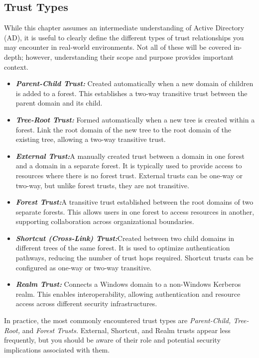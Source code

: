 \subsection{Trust Types}
While this chapter assumes an intermediate understanding of Active Directory (AD), it is useful to clearly define the different types of trust relationships you may encounter in real-world environments. Not all of these will be covered in-depth; however, understanding their scope and purpose provides important context.
\begin{itemize}
    \item \textbf{\textit{Parent-Child Trust:}} Created automatically when a new domain of children is added to a forest. This establishes a two-way transitive trust between the parent domain and its child.
        \item \textbf{\textit{Tree-Root Trust:}} Formed automatically when a new tree is created within a forest. Link the root domain of the new tree to the root domain of the existing tree, allowing a two-way transitive trust.
        \item \textbf{\textit{External Trust:}}A manually created trust between a domain in one forest and a domain in a separate forest. It is typically used to provide access to resources where there is no forest trust. External trusts can be one-way or two-way, but unlike forest trusts, they are not transitive.
        \item \textbf{\textit{Forest Trust:}}A transitive trust established between the root domains of two separate forests. This allows users in one forest to access resources in another, supporting collaboration across organizational boundaries.
        \item \textbf{\textit{Shortcut (Cross-Link) Trust:}}Created between two child domains in different trees of the same forest. It is used to optimize authentication pathways, reducing the number of trust hops required. Shortcut trusts can be configured as one-way or two-way transitive.
        \item \textbf{\textit{Realm Trust: }}Connects a Windows domain to a non-Windows Kerberos realm. This enables interoperability, allowing authentication and resource access across different security infrastructures.
\end{itemize}

In practice, the most commonly encountered trust types are \textit{Parent-Child, Tree-Root,} and \textit{Forest Trusts.} External, Shortcut, and Realm trusts appear less frequently, but you should be aware of their role and potential security implications associated with them.

